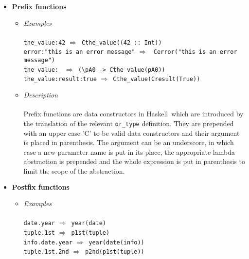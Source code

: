 \documentclass{article}
\def\H{Haskell}
\def\lra{$\Longrightarrow$\ }
\begin{document}
\begin{itemize}
\item
\textbf{Prefix functions}
\begin{itemize}
\item
\textit{Examples}\\\\
\verb|the_value:42| \lra \verb|Cthe_value((42 :: Int))| \\
\texttt{error:"this is an error message"} \lra
\texttt{Cerror("this is an error message")} \\
\verb|the_value:_| \lra \verb|(\pA0 -> Cthe_value(pA0))| \\
\verb|the_value:result:true| \lra \verb|Cthe_value(Cresult(True))| \\

\item
\textit{Description}\\\\
Prefix functions are data constructors in \H\ which are introduced by the
translation of the relevant \verb|or_type| definition. They are prepended
with an upper case 'C' to be valid data constructors and their argument is
placed in parenthesis. The argument can be an underscore, in which case a new
parameter name is put in its place, the appropriate lambda abstraction is
prepended and the whole expression is put in parenthesis to limit the scope of
the abstraction.
\end{itemize}

\item
\textbf{Postfix functions}

\begin{itemize}
\item
\textit{Examples}\\\\
\texttt{date.year} \lra \texttt{year(date)} \\
\texttt{tuple.1st} \lra \texttt{p1st(tuple)} \\
\texttt{info.date.year} \lra \texttt{year(date(info))} \\
\texttt{tuple.1st.2nd} \lra \texttt{p2nd(p1st(tuple))} \\


\end{itemize}
\end{itemize}
\end{document}
